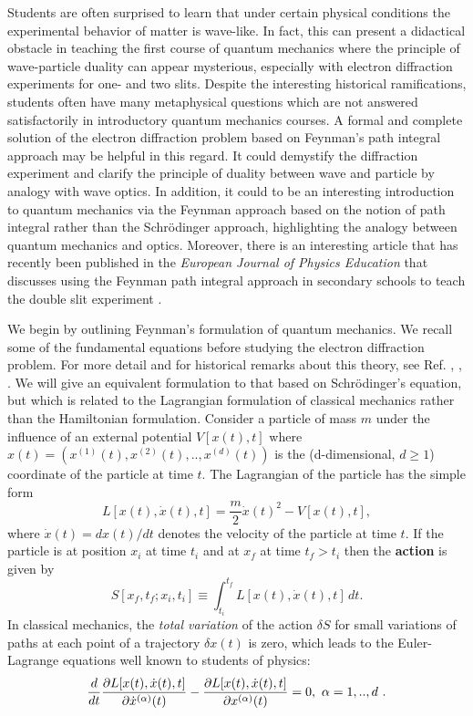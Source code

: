 \documentclass[12pt]{article}   %
\begin{document}
Students are often surprised to learn that under certain
physical conditions the experimental behavior of matter is
wave-like. In fact, this can present a didactical obstacle in
teaching the first course of quantum mechanics where the
principle of wave-particle duality can appear mysterious,
especially with electron diffraction experiments for one- and
two slits. Despite the interesting historical ramifications,
students often have many metaphysical questions which are not
answered satisfactorily in introductory quantum mechanics
courses. A formal and complete solution of the electron
diffraction problem based on Feynman's path integral approach
may be helpful in this regard. It could demystify the
diffraction experiment and clarify the principle of duality
between wave and particle by analogy with wave optics. In
addition, it could to be an interesting introduction to quantum
mechanics via the Feynman approach based on the notion of path
integral rather than the Schr\"odinger approach, highlighting
the analogy between quantum mechanics and optics.
Moreover, there is an interesting article that has recently been published 
in the \textit{European Journal of Physics Education}
that discusses using the Feynman path integral approach in secondary schools 
to teach the double slit experiment \cite{Fanaro}.



We begin by outlining Feynman's formulation of quantum mechanics.
We recall some of the fundamental equations before studying the
electron diffraction problem. For more detail and for historical
remarks about this theory, see Ref. \cite{FH},
\cite{Feynman2}, \cite{Feynman3}. We will give an equivalent formulation to that
based on Schr\"odinger's equation, but which is related to the
Lagrangian formulation of classical mechanics rather than the
Hamiltonian formulation. Consider a particle of mass $m$ under the
influence of an external potential $V[x(t),t]$ 
where $x(t)=(x^{(1)}(t),x^{(2)}(t),..,x^{(d)}(t))$ is the
(d-dimensional, $d\geq1$) coordinate of the particle at time $t$. The Lagrangian of
the particle has the simple form $$ L[x(t),\dot{x}(t),t] =
\frac{m}{2}\dot{x}(t)^2-V[x(t),t],
$$ where $\dot{x}(t) = dx(t)/dt$ denotes the velocity of the
particle at time $t$. If the particle is at position $x_i$ at time
$t_i$ and at $x_f$ at time $t_f>t_i$ then the \textbf{action} is
given by 
$$ S[x_f,t_f;x_i,t_i] \equiv
\int_{t_i}^{t_f} L[x(t),\dot{x}(t),t]\, dt. $$ 
In classical mechanics, the \textit{total variation} of the action $ \delta S $
for small variations of paths at each point of a trajectory
$\delta x(t) $ is zero, which leads to the Euler-Lagrange
equations well known to students of physics:
\begin{eqnarray*}
{d \over dt}{\partial L[x(t),\dot{x}(t),t]  \over
\partial\dot{x}^{(\alpha)}(t)} - {\partial L[x(t),\dot{x}(t),t]  \over
\partial x^{(\alpha)}(t)} = 0,\ \alpha=1,..,d\ .
\end{eqnarray*}
\end{document}
